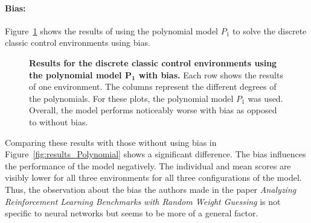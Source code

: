 \paragraph*{Bias:} Figure~\ref{fig:results_Polynomial_bias} shows the results of using the polynomial model $P_1$ to solve the discrete classic control environments using bias.
\begin{figure}[!ht]
\begin{figrow}
\item \label{row:Polynomial_CartPole_bias}  
\item \label{row:Polynomial_Acrobot_bias}  
\item \label{row:Polynomial_MountainCar_bias}  
\end{figrow}
\caption[Results for the discrete classic control environments using the polynomial model $\mathbf{P_1}$ with bias]{
  \textbf{Results for the discrete classic control environments using the polynomial model $\mathbf{P_1}$ with bias.}
   Each row shows the results of one environment. The columns represent the different degrees of the polynomials. For these plots, the polynomial model $P_1$ was used. Overall, the model performs noticeably worse with bias as opposed to without bias.
}
\label{fig:results_Polynomial_bias}
\end{figure}
Comparing these results with those without using bias in Figure~\ref{fig:results_Polynomial} shows a significant difference. The bias influences the performance of the model negatively. The individual and mean scores are visibly lower for all three environments for all three configurations of the model. Thus, the observation about the bias the authors made in the paper \emph{Analyzing Reinforcement Learning Benchmarks with Random Weight Guessing} is not specific to neural networks but seems to be more of a general factor.

